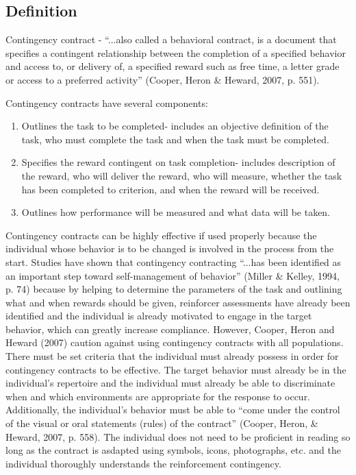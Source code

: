 \subsection{Definition}
Contingency contract -  ``...also called a behavioral contract, is a document that specifies a contingent relationship between the completion of a specified behavior and access to, or delivery of, a specified reward such as free time, a letter grade or access to a preferred activity'' (Cooper, Heron \& Heward, 2007, p. 551). 

Contingency contracts have several components: 
\begin{enumerate}
\item Outlines the task to be completed- includes an objective definition of the task, who must complete the task and when the task must be completed.
\item Specifies the reward contingent on task completion- includes description of the reward, who will deliver the reward, who will measure, whether the task has been completed to criterion, and when the reward will be received.
\item Outlines how performance will be measured and what data will be taken. 
\end{enumerate}

Contingency contracts can be highly effective if used properly because the individual whose behavior is to be changed is involved in the process from the start. Studies have shown that contingency contracting ``...has been identified as an important step toward self-management of behavior'' (Miller \& Kelley, 1994, p. 74) because by helping to determine the parameters of the task and outlining what and when rewards should be given, reinforcer assessments have already been identified and the individual is already motivated to engage in the target behavior, which can greatly increase compliance. However, Cooper, Heron and Heward (2007) caution against using contingency contracts with all populations. There must be set criteria that the individual must already possess in order for contingency contracts to be effective. The target behavior must already be in the individual's repertoire and the individual must already be able to discriminate when and which environments are appropriate for the response to occur. Additionally, the individual's behavior must be able to ``come under the control of the visual or oral statements (rules) of the contract'' (Cooper, Heron, \& Heward, 2007, p. 558).  The individual does not need to be proficient in reading so long as the contract is asdapted using symbols, icons, photographs, etc. and the individual thoroughly understands the reinforcement contingency. 
%
